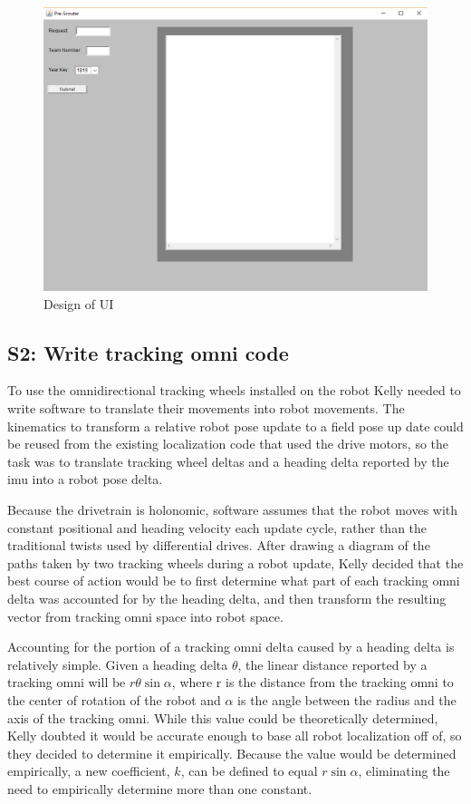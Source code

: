\documentclass{article}
\begin{document}
\begin{figure}
    \centering
    \includegraphics[width=.6 \textwidth]{24_02-11/images/prescoutingapp.png}
    \caption{Design of UI}
    \label{fig:UI}
\end{figure}

\subsection{S2: Write tracking omni code}

To use the omnidirectional tracking wheels installed on the robot Kelly needed to write software to translate their movements into robot movements. The kinematics to transform a relative robot pose update to a field pose up date could be reused from the existing localization code that used the drive motors, so the task was to translate tracking wheel deltas and a heading delta reported by the imu into a robot pose delta. 

Because the drivetrain is holonomic, software assumes that the robot moves with constant positional and heading velocity each update cycle, rather than the traditional twists used by differential drives. 
After drawing a diagram of the paths taken by two tracking wheels during a robot update, Kelly decided that the best course of action would be to first determine what part of each tracking omni delta was accounted for by the heading delta, and then transform the resulting vector from tracking omni space into robot space. 

Accounting for the portion of a tracking omni delta caused by a heading delta is relatively simple. Given a heading delta $\theta$, the linear distance reported by a tracking omni will be $r \theta \sin\alpha$, where r is the distance from the tracking omni to the center of rotation of the robot and $\alpha$ is the angle between the radius and the axis of the tracking omni. While this value could be theoretically determined, Kelly doubted it would be accurate enough to base all robot localization off of, so they decided to determine it empirically. Because the value would be determined empirically, a new coefficient, $k$, can be defined to equal $r \sin\alpha$, eliminating the need to empirically determine more than one constant.
\end{document}
